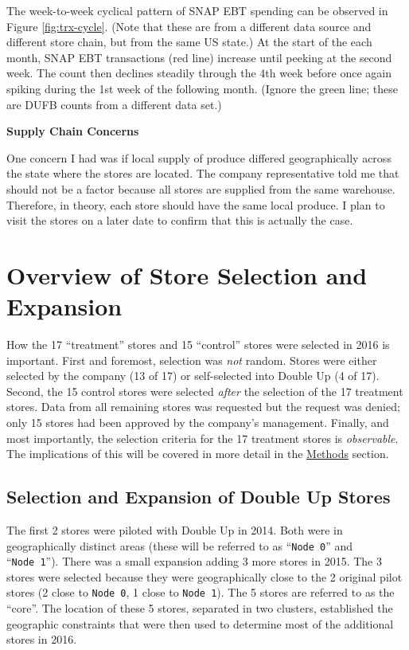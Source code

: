 \documentclass[12pt,letterpaperpaper,]{book}
\begin{document}
The week-to-week cyclical pattern of SNAP EBT spending can be observed
in Figure \ref{fig:trx-cycle}. (Note that these are from a different
data source and different store chain, but from the same US state.) At
the start of the each month, SNAP EBT transactions (red line) increase
until peeking at the second week. The count then declines steadily
through the 4th week before once again spiking during the 1st week of
the following month. (Ignore the green line; these are DUFB counts from
a different data set.)

\textbf{Supply Chain Concerns}

One concern I had was if local supply of produce differed geographically
across the state where the stores are located. The company
representative told me that should not be a factor because all stores
are supplied from the same warehouse. Therefore, in theory, each store
should have the same local produce. I plan to visit the stores on a
later date to confirm that this is actually the case.

\hypertarget{store-selection-1}{\section*{Overview of Store Selection
and Expansion}\label{store-selection-1}}

How the 17 ``treatment'' stores and 15 ``control'' stores were selected
in 2016 is important. First and foremost, selection was \emph{not}
random. Stores were either selected by the company (13 of 17) or
self-selected into Double Up (4 of 17). Second, the 15 control stores
were selected \emph{after} the selection of the 17 treatment stores.
Data from all remaining stores was requested but the request was denied;
only 15 stores had been approved by the company's management. Finally,
and most importantly, the selection criteria for the 17 treatment stores
is \emph{observable}. The implications of this will be covered in more
detail in the \protect\hyperlink{methods}{Methods} section.

\subsection*{Selection and Expansion of Double Up
Stores}\label{selection-and-expansion-of-double-up-stores}

The first 2 stores were piloted with Double Up in 2014. Both were in
geographically distinct areas (these will be referred to as
``\texttt{Node\ 0}'' and ``\texttt{Node\ 1}''). There was a small
expansion adding 3 more stores in 2015. The 3 stores were selected
because they were geographically close to the 2 original pilot stores (2
close to \texttt{Node\ 0}, 1 close to \texttt{Node\ 1}). The 5 stores
are referred to as the ``core''. The location of these 5 stores,
separated in two clusters, established the geographic constraints that
were then used to determine most of the additional stores in 2016.
\end{document}
